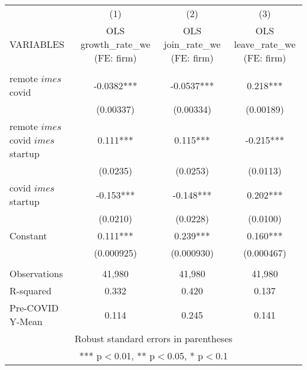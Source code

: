 \documentclass[]{article}
\begin{document}
\begin{tabular}{lccc} \hline
 & (1) & (2) & (3) \\
VARIABLES & OLS growth\_rate\_we (FE: firm) & OLS join\_rate\_we (FE: firm) & OLS leave\_rate\_we (FE: firm) \\ \hline
 &  &  &  \\
remote $	imes$ covid & -0.0382*** & -0.0537*** & 0.218*** \\
 & (0.00337) & (0.00334) & (0.00189) \\
remote $	imes$ covid $	imes$ startup & 0.111*** & 0.115*** & -0.215*** \\
 & (0.0235) & (0.0253) & (0.0113) \\
covid $	imes$ startup & -0.153*** & -0.148*** & 0.202*** \\
 & (0.0210) & (0.0228) & (0.0100) \\
Constant & 0.111*** & 0.239*** & 0.160*** \\
 & (0.000925) & (0.000930) & (0.000467) \\
 &  &  &  \\
Observations & 41,980 & 41,980 & 41,980 \\
R-squared & 0.332 & 0.420 & 0.137 \\
 Pre-COVID Y-Mean & 0.114 & 0.245 & 0.141 \\ \hline
\multicolumn{4}{c}{ Robust standard errors in parentheses} \\
\multicolumn{4}{c}{ *** p$<$0.01, ** p$<$0.05, * p$<$0.1} \\
\end{tabular}
\end{document}
